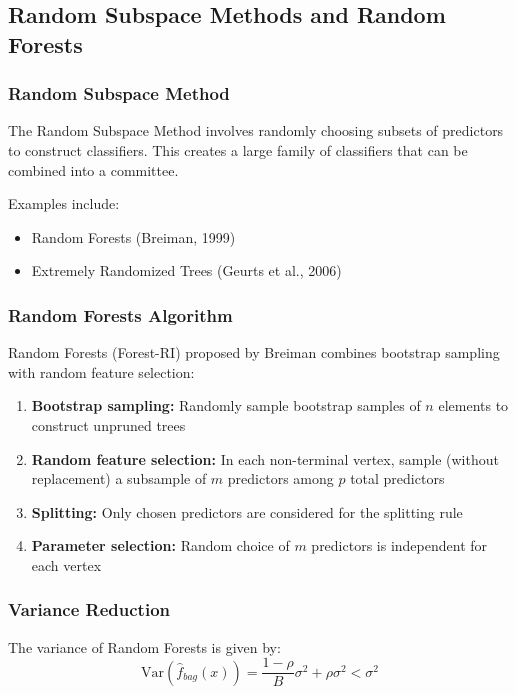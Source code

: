 \documentclass[12pt,a4paper]{article}
\begin{document}
\subsection{Random Subspace Methods and Random Forests}

\subsubsection{Random Subspace Method}
The Random Subspace Method involves randomly choosing subsets of predictors to construct classifiers. This creates a large family of classifiers that can be combined into a committee.

Examples include:
\begin{itemize}
    \item Random Forests (Breiman, 1999)
    \item Extremely Randomized Trees (Geurts et al., 2006)
\end{itemize}

\subsubsection{Random Forests Algorithm}
Random Forests (Forest-RI) proposed by Breiman combines bootstrap sampling with random feature selection:

\begin{enumerate}
    \item \textbf{Bootstrap sampling:} Randomly sample bootstrap samples of $n$ elements to construct unpruned trees
    \item \textbf{Random feature selection:} In each non-terminal vertex, sample (without replacement) a subsample of $m$ predictors among $p$ total predictors
    \item \textbf{Splitting:} Only chosen predictors are considered for the splitting rule
    \item \textbf{Parameter selection:} Random choice of $m$ predictors is independent for each vertex
\end{enumerate}

\subsubsection{Variance Reduction}
The variance of Random Forests is given by:
\begin{equation}
\text{Var}(\hat{f}_{bag}(x)) = \frac{1-\rho}{B}\sigma^2 + \rho\sigma^2 < \sigma^2
\end{equation}
\end{document}
